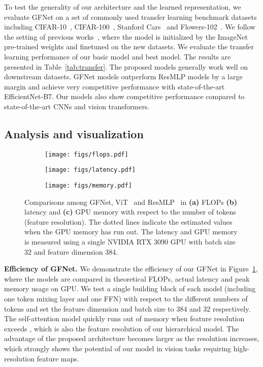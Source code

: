 \documentclass{article}
\numberwithin{equation}{section}
\newcommand{\gknet}{GFNet}
\newcommand{\paragrapha}[2][1pt]{\vspace{#1}\noindent\textbf{#2}}
\begin{document}
To test the generality of our architecture and the learned representation, we evaluate GFNet on a set of commonly used transfer learning benchmark datasets including CIFAR-10~\cite{cifar}, CIFAR-100~\cite{cifar}, Stanford Cars~\cite{cars} and Flowers-102~\cite{flower}. We follow the setting of previous works~\cite{tan2019efficientnet,dosovitskiy2020vit,touvron2020deit,touvron2021resmlp}, where the model is initialized by the ImageNet pre-trained weights and finetuned on the new datasets.
We evaluate the transfer learning performance of our basic model and best model. The results are presented in Table~\ref{tab:transfer}. The proposed models generally work well on downstream datasets. GFNet models outperform ResMLP models by a large margin and achieve very competitive performance with state-of-the-art EfficientNet-B7. Our models also show competitive performance compared to state-of-the-art CNNs and vision transformers. 
 
 

\subsection{Analysis and visualization}

\begin{figure}[t]
\begin{subfigure}{.33\textwidth}
\texttt{[image: figs/flops.pdf]}
\caption{}
\end{subfigure}
\begin{subfigure}{.33\textwidth}
\texttt{[image: figs/latency.pdf]}
\caption{}
\end{subfigure}
\begin{subfigure}{.33\textwidth}
\texttt{[image: figs/memory.pdf]}
\caption{}
\end{subfigure} 
\caption{Comparisons among \gknet, ViT~\cite{dosovitskiy2020vit} and ResMLP~\cite{touvron2021resmlp} in \textbf{(a)} FLOPs \textbf{(b)} latency and \textbf{(c)} GPU memory with respect to the number of tokens (feature resolution). The dotted lines indicate the estimated values when the GPU memory has run out. The latency and GPU memory is measured using a single NVIDIA RTX 3090 GPU with batch size 32 and feature dimension 384. }
\label{fig:eff} 
\end{figure}

\paragrapha{Efficiency of GFNet.} We demonstrate the efficiency of our GFNet in Figure~\ref{fig:eff}, where the models are compared in theoretical FLOPs, actual latency and peak memory usage on GPU. We test a single building block of each model (including one token mixing layer and one FFN) with respect to the different numbers of tokens and set the feature dimension and batch size to 384 and 32 respectively. The self-attention model quickly runs out of memory when feature resolution exceeds , which is also the feature resolution of our hierarchical model. The advantage of the proposed architecture becomes larger as the resolution increases, which strongly shows the potential of our model in vision tasks requiring high-resolution feature maps.
\end{document}
